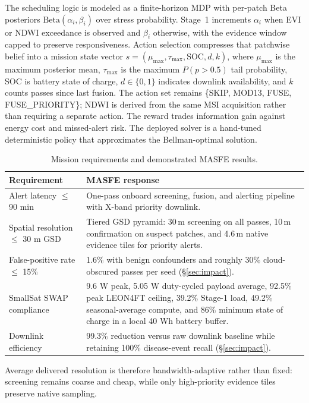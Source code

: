\documentclass[11pt,letterpaper]{article}
\begin{document}
The scheduling logic is modeled as a finite-horizon MDP with per-patch Beta posteriors $\text{Beta}(\alpha_i,\beta_i)$ over stress probability. Stage~1 increments $\alpha_i$ when EVI or NDWI exceedance is observed and $\beta_i$ otherwise, with the evidence window capped to preserve responsiveness. Action selection compresses that patchwise belief into a mission state vector $s = (\mu_{\max}, \tau_{\max}, \text{SOC}, d, k)$, where $\mu_{\max}$ is the maximum posterior mean, $\tau_{\max}$ is the maximum $P(p > 0.5)$ tail probability, SOC is battery state of charge, $d \in \{0,1\}$ indicates downlink availability, and $k$ counts passes since last fusion. The action set remains \{SKIP, MOD13, FUSE, FUSE\_PRIORITY\}; NDWI is derived from the same MSI acquisition rather than requiring a separate action. The reward trades information gain against energy cost and missed-alert risk. The deployed solver is a hand-tuned deterministic policy that approximates the Bellman-optimal solution.

\begin{table}[!htbp]
\centering
\caption{Mission requirements and demonstrated MASFE results.}
\label{tab:req-results}
\begin{tabularx}{\linewidth}{p{4cm}X}
\toprule
\textbf{Requirement} & \textbf{MASFE response} \\
\midrule
Alert latency $\leq$ 90 min & One-pass onboard screening, fusion, and alerting pipeline with X-band priority downlink. \\
Spatial resolution $\leq$ 30 m GSD & Tiered GSD pyramid: 30\,m screening on all passes, 10\,m confirmation on suspect patches, and 4.6\,m native evidence tiles for priority alerts. \\
False-positive rate $\leq$ 15\% & 1.6\% with benign confounders and roughly 30\% cloud-obscured passes per seed (\S\ref{sec:impact}). \\
SmallSat SWAP compliance & 9.6 W peak, 5.05 W duty-cycled payload average, 92.5\% peak LEON4FT ceiling, 39.2\% Stage-1 load, 49.2\% seasonal-average compute, and 86\% minimum state of charge in a local 40 Wh battery buffer. \\
Downlink efficiency & 99.3\% reduction versus raw downlink baseline while retaining 100\% disease-event recall (\S\ref{sec:impact}). \\
\bottomrule
\end{tabularx}
\end{table}

Average delivered resolution is therefore bandwidth-adaptive rather than fixed: screening remains coarse and cheap, while only high-priority evidence tiles preserve native sampling.
\end{document}
